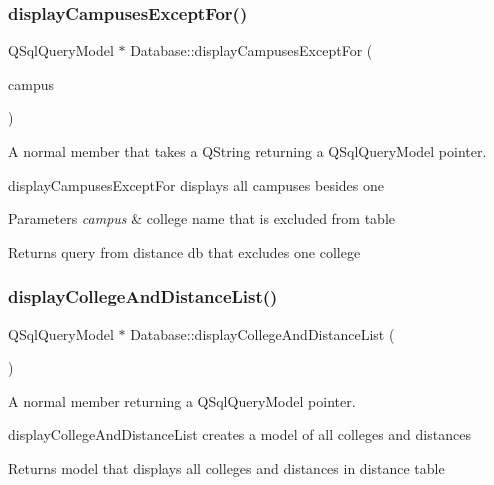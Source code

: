 \subsubsection{\texorpdfstring{display\+Campuses\+Except\+For()}{displayCampusesExceptFor()}}
{\footnotesize\ttfamily Q\+Sql\+Query\+Model $\ast$ Database\+::display\+Campuses\+Except\+For (\begin{DoxyParamCaption}\item[{Q\+String}]{campus }\end{DoxyParamCaption})}



A normal member that takes a Q\+String returning a Q\+Sql\+Query\+Model pointer. 

display\+Campuses\+Except\+For displays all campuses besides one 
\begin{DoxyParams}{Parameters}
{\em campus} & college name that is excluded from table \\
\hline
\end{DoxyParams}
\begin{DoxyReturn}{Returns}
query from distance db that excludes one college 
\end{DoxyReturn}
\mbox{\label{class_database_a6037c904ea4053908cefb67c2d05bd29}} 
\subsubsection{\texorpdfstring{display\+College\+And\+Distance\+List()}{displayCollegeAndDistanceList()}}
{\footnotesize\ttfamily Q\+Sql\+Query\+Model $\ast$ Database\+::display\+College\+And\+Distance\+List (\begin{DoxyParamCaption}{ }\end{DoxyParamCaption})}



A normal member returning a Q\+Sql\+Query\+Model pointer. 

display\+College\+And\+Distance\+List creates a model of all colleges and distances \begin{DoxyReturn}{Returns}
model that displays all colleges and distances in distance table 
\end{DoxyReturn}
\mbox{\label{class_database_a1979fb1dc3dbf64321c0d0f7e373f08c}} 
